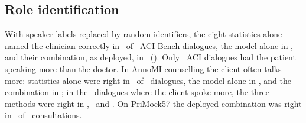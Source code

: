 \subsection{Role identification}
With speaker labels replaced by random identifiers, the eight statistics alone named the clinician correctly in \ResRoleStatsCorrect\ of \ResRoleN\ ACI-Bench dialogues, the model alone in \ResRoleLlmCorrect, and their combination, as deployed, in \ResRoleCombinedCorrect\ (\ResRoleCombined). Only \ResRoleHardN\ ACI dialogues had the patient speaking more than the doctor. In AnnoMI counselling the client often talks more: statistics alone were right in \ResAnnoRoleStats\ of \ResAnnoRoleN\ dialogues, the model alone in \ResAnnoRoleLlm, and the combination in \ResAnnoRoleCombined; in the \ResAnnoRoleHardN\ dialogues where the client spoke more, the three methods were right in \ResAnnoRoleHardStats, \ResAnnoRoleHardLlm\ and \ResAnnoRoleHardCombined. On PriMock57 the deployed combination was right in \ResPmRoleCorrect\ of \ResPmRoleN\ consultations.

